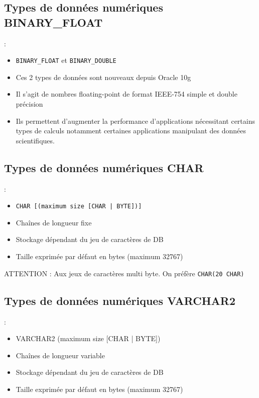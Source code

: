 \documentclass[10pt]{beamer}
\begin{document}
\subsection{Types de données numériques BINARY\_FLOAT}
\begin{frame}{\secname : \subsecname}
    \begin{itemize}
        \item \lstinline[language=plsql]!BINARY_FLOAT! et \lstinline[language=plsql]!BINARY_DOUBLE!
        \item Ces 2 types de données sont nouveaux depuis Oracle 10g
        \item Il s'agit de nombres floating-point de format IEEE-754 simple et double précision
        \item Ils permettent d'augmenter la performance d'applications nécessitant certains types de calculs notamment certaines applications manipulant des données scientifiques.
    \end{itemize}
\end{frame}

\subsection{Types de données numériques CHAR}
\begin{frame}{\secname : \subsecname}
    \begin{itemize}
        \item \lstinline[language=plsql]!CHAR [(maximum size [CHAR | BYTE])]!
        \item Chaînes de longueur fixe
        \item Stockage dépendant du jeu de caractères de DB
        \item Taille exprimée par défaut en bytes (maximum 32767)
    \end{itemize}
    ATTENTION : Aux jeux de caractères multi byte. On préfère \lstinline[language=plsql]!CHAR(20 CHAR)!
\end{frame}

\subsection{Types de données numériques VARCHAR2}
\begin{frame}{\secname : \subsecname}
    \begin{itemize}
        \item VARCHAR2 (maximum size [CHAR | BYTE])
        \item Chaînes de longueur variable
        \item Stockage dépendant du jeu de caractères de DB
        \item Taille exprimée par défaut en bytes (maximum 32767)
    \end{itemize}
\end{frame}
\end{document}
